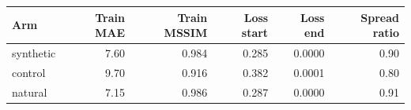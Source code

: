 \begin{tabular}{lrrrrr}
\hline
Arm & Train MAE & Train MSSIM & Loss start & Loss end & Spread ratio \\
\hline
synthetic & 7.60 & 0.984 & 0.285 & 0.0000 & 0.90 \\
control & 9.70 & 0.916 & 0.382 & 0.0001 & 0.80 \\
natural & 7.15 & 0.986 & 0.287 & 0.0000 & 0.91 \\
\hline
\end{tabular}
